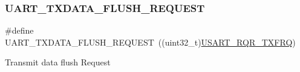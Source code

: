 \subsubsection{\texorpdfstring{U\+A\+R\+T\+\_\+\+T\+X\+D\+A\+T\+A\+\_\+\+F\+L\+U\+S\+H\+\_\+\+R\+E\+Q\+U\+E\+ST}{UART\_TXDATA\_FLUSH\_REQUEST}}
{\footnotesize\ttfamily \#define U\+A\+R\+T\+\_\+\+T\+X\+D\+A\+T\+A\+\_\+\+F\+L\+U\+S\+H\+\_\+\+R\+E\+Q\+U\+E\+ST~((uint32\+\_\+t)\hyperlink{group___peripheral___registers___bits___definition_gaa40d2e52b5955b30c9399eb3dec769e8}{U\+S\+A\+R\+T\+\_\+\+R\+Q\+R\+\_\+\+T\+X\+F\+RQ})}

Transmit data flush Request 